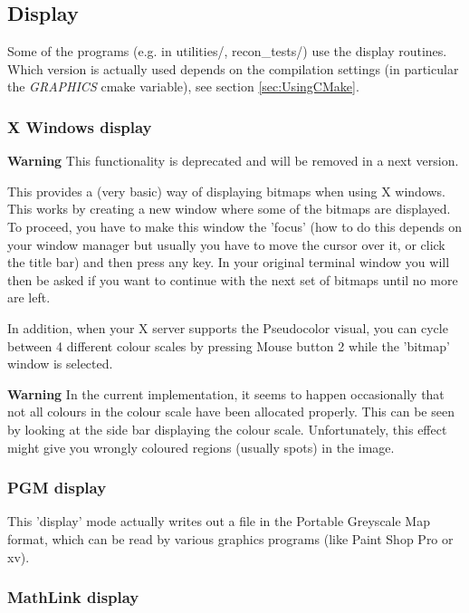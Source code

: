 \documentclass{article}
\begin{document}
{{\subsection{
Display}

Some of the programs (e.g. in utilities/, recon\_tests/) use 
the display routines. Which version is actually used depends 
on the compilation settings (in particular the \textit{GRAPHICS} cmake 
variable), see section \ref{sec:UsingCMake}. 


\subsubsection{
X Windows display}
\label{sec:display}
\textbf{Warning} This functionality is deprecated and will be removed in a next version.

This provides a (very basic) way of displaying bitmaps when using 
X windows. This works by creating a new window where some of 
the bitmaps are displayed. To proceed, you have to make this 
window the 'focus' (how to do this depends on your window manager 
but usually you have to move the cursor over it, or click the 
title bar) and then press any key. In your original terminal 
window you will then be asked if you want to continue with the 
next set of bitmaps until no more are left.


In addition, when your X server supports the Pseudocolor visual, 
you can cycle between 4 different colour scales by pressing Mouse 
button 2 while the 'bitmap' window is selected.


\textbf{Warning} In the current implementation, it seems to happen 
occasionally that not all colours in the colour scale have been 
allocated properly. This can be seen by looking at the side bar 
displaying the colour scale. Unfortunately, this effect might 
give you wrongly coloured regions (usually spots) in the image.


\subsubsection{
PGM display}

This 'display' mode actually writes out a file in the Portable 
Greyscale Map format, which can be read by various graphics programs 
(like Paint Shop Pro or xv).


\subsubsection{
MathLink display}

}}
\end{document}
